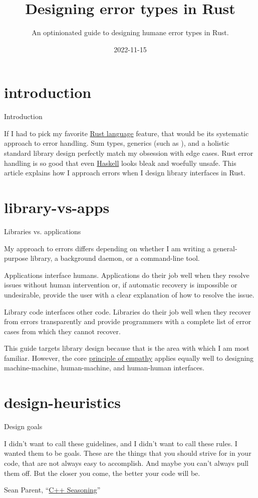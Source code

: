 \documentclass{article}
\title{Designing error types in Rust}
\subtitle{An optinionated guide to designing humane error types in Rust.}
\date{2022-11-15}
\begin{document}
\section{introduction}{Introduction}

If I had to pick my favorite \href{https://www.rust-lang.org/}{Rust language} feature, that would be its systematic approach to error handling.
Sum types, generics (such as \href{https://doc.rust-lang.org/std/result/enum.Result.html}{}), and a holistic standard library design perfectly match my obsession with edge cases.
Rust error handling is so good that even \href{https://haskell.org/}{Haskell} looks bleak and woefully unsafe.
This article explains how I approach errors when I design library interfaces in Rust.

\section{library-vs-apps}{Libraries vs. applications}

My approach to errors differs depending on whether I am writing a general-purpose library, a background daemon, or a command-line tool.

Applications interface humans.
Applications do their job well when they resolve issues without human intervention or, if automatic recovery is impossible or undesirable, provide the user with a clear explanation of how to resolve the issue.

Library code interfaces other code.
Libraries do their job well when they recover from errors transparently and provide programmers with a complete list of error cases from which they cannot recover.

This guide targets library design because that is the area with which I am most familiar.
However, the core \href{#empathy}{principle of empathy} applies equally well to designing machine-machine, human-machine, and human-human interfaces.

\section{design-heuristics}{Design goals}
\epigraph{
  I didn't want to call these guidelines, and I didn't want to call these rules.
  I wanted them to be goals.
  These are the things that you should strive for in your code, that are not always easy to accomplish.
  And maybe you can't always pull them off.
  But the closer you come, the better your code will be.
}{Sean Parent, ``\href{https://youtu.be/W2tWOdzgXHA?t=107}{C++ Seasoning}''}
\end{document}
